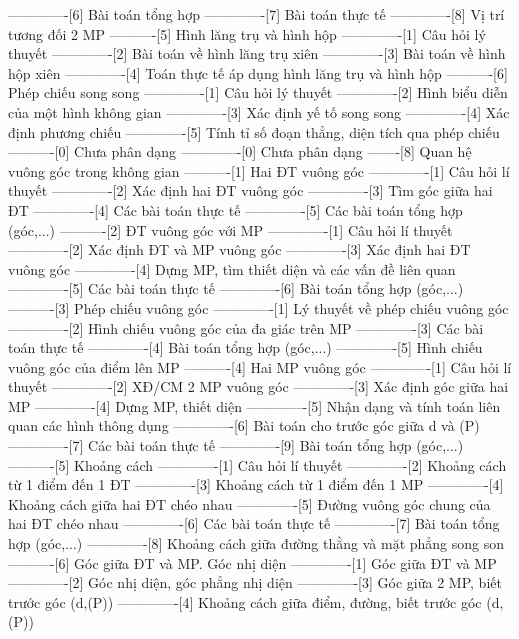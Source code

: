 -------------[6] Bài toán tổng hợp
-------------[7] Bài toán thực tế
-------------[8] Vị trí tương đối 2 MP
----------[5] Hình lăng trụ và hình hộp
-------------[1] Câu hỏi lý thuyết
-------------[2] Bài toán về hình lăng trụ xiên
-------------[3] Bài toán về hình hộp xiên
-------------[4] Toán thực tế áp dụng hình lăng trụ và hình hộp
----------[6] Phép chiếu song song
-------------[1] Câu hỏi lý thuyết
-------------[2] Hình biểu diễn của một hình không gian
-------------[3] Xác định yế tố song song
-------------[4] Xác định phương chiếu
-------------[5] Tính tỉ số đoạn thẳng, diện tích qua phép chiếu
----------[0] Chưa phân dạng
-------------[0] Chưa phân dạng
-------[8] Quan hệ vuông góc trong không gian
----------[1] Hai ĐT vuông góc
-------------[1] Câu hỏi lí thuyết
-------------[2] Xác định hai ĐT vuông góc
-------------[3] Tìm góc giữa hai ĐT
-------------[4] Các bài toán thực tế
-------------[5] Các bài toán tổng hợp  (góc,...)
----------[2] ĐT vuông góc với MP
-------------[1] Câu hỏi lí thuyết
-------------[2] Xác định ĐT và MP vuông góc
-------------[3] Xác định hai ĐT vuông góc
-------------[4] Dựng MP, tìm thiết diện và các vấn đề liên quan
-------------[5] Các bài toán thực tế
-------------[6] Bài toán tổng hợp (góc,...)
----------[3] Phép chiếu vuông góc
-------------[1] Lý thuyết về phép chiếu vuông góc
-------------[2] Hình chiếu vuông góc của đa giác trên MP
-------------[3] Các bài toán thực tế
-------------[4] Bài toán tổng hợp (góc,...)
-------------[5] Hình chiếu vuông góc của điểm lên MP
----------[4] Hai MP vuông góc
-------------[1] Câu hỏi lí thuyết
-------------[2] XĐ/CM 2 MP vuông góc
-------------[3] Xác định góc giữa hai MP
-------------[4] Dựng MP, thiết diện
-------------[5] Nhận dạng và tính toán liên quan các hình thông dụng
-------------[6] Bài toán cho trước góc giữa d và (P)
-------------[7] Các bài toán thực tế
-------------[9] Bài toán tổng hợp (góc,...)
----------[5] Khoảng cách
-------------[1] Câu hỏi lí thuyết
-------------[2] Khoảng cách từ 1 điểm đến 1 ĐT
-------------[3] Khoảng cách từ 1 điểm đến 1 MP
-------------[4] Khoảng cách giữa hai ĐT chéo nhau
-------------[5] Đường vuông góc chung của hai ĐT chéo nhau
-------------[6] Các bài toán thực tế
-------------[7] Bài toán tổng hợp (góc,...)
-------------[8] Khoảng cách giữa đường thằng và mặt phẳng song son
----------[6] Góc giữa ĐT và MP. Góc nhị diện
-------------[1] Góc giữa ĐT và MP
-------------[2] Góc nhị diện, góc phẳng nhị diện
-------------[3] Góc giữa 2 MP, biết trước góc (d,(P))
-------------[4] Khoảng cách giữa điểm, đường, biết trước góc (d,(P))
